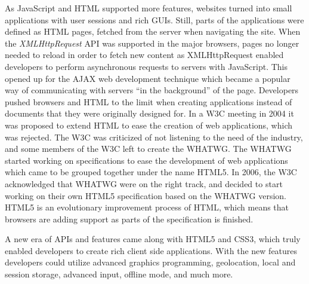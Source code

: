 \documentclass[a4paper,11pt]{kth-mag}
\begin{document}
        As \gls{JavaScript} and \gls{HTML} supported more features, websites turned into small applications with user sessions and rich \glspl{GUI}.
        Still, parts of the applications were defined as \gls{HTML} pages, fetched from the server when navigating the site.
        When the \emph{XMLHttpRequest} \gls{API} was supported in the major \glspl{browser}, pages no longer needed to reload in order to fetch new content as XMLHttpRequest enabled developers to perform asynchronous requests to servers with \gls{JavaScript}.
        This opened up for the \gls{AJAX} \gls{web} development technique which became a popular way of communicating with servers ``in the background'' of the page.
        Developers pushed \glspl{browser} and \gls{HTML} to the limit when creating applications instead of \glspl{document} that they were originally designed for.
        In a \gls{W3C} meeting in 2004 it was proposed to extend \gls{HTML} to ease the creation of \gls{web} applications, which was rejected.
        The \gls{W3C} was criticized of not listening to the need of the industry, and some members of the \gls{W3C} left to create the \gls{WHATWG}.
        The \gls{WHATWG} started working on specifications to ease the development of \gls{web} applications which came to be grouped together under the name \gls{HTML5}.
        In 2006, the \gls{W3C} acknowledged that \gls{WHATWG} were on the right track, and decided to start working on their own \gls{HTML5} specification based on the \gls{WHATWG} version.
        \gls{HTML5} is an evolutionary improvement process of \gls{HTML}, which means that \glspl{browser} are adding support as parts of the specification is finished.

        A new era of \glspl{API} and features came along with \gls{HTML5} and \gls{CSS3}, which truly enabled developers to create rich client side applications.
        With the new features developers could utilize advanced graphics programming, geolocation, local and session storage, advanced input, offline mode, and much more.

\end{document}

